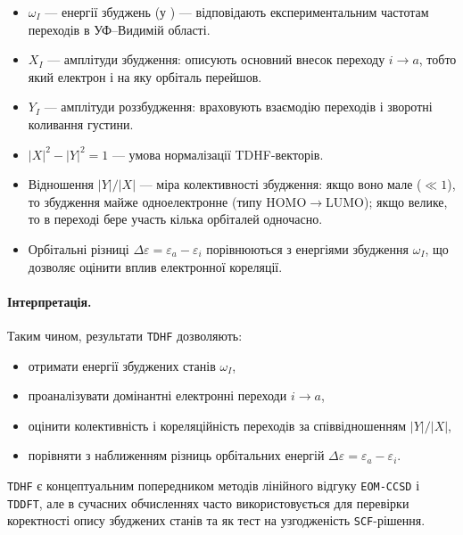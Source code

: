 \begin{itemize}
    \item \(\omega_I\) --- енергії збуджень (у ) ---
          відповідають експериментальним частотам переходів в УФ–Видимій області.
    \item \(X_I\) --- амплітуди збудження: описують основний внесок переходу \(i \to a\),
          тобто який електрон і на яку орбіталь перейшов.
    \item \(Y_I\) --- амплітуди роззбудження: враховують взаємодію переходів
          і зворотні коливання густини.
    \item \(|X|^2 - |Y|^2 = 1\) --- умова нормалізації TDHF-векторів.
    \item Відношення \(|Y|/|X|\) --- міра колективності збудження:
          якщо воно мале ($\ll 1$), то збудження майже одноелектронне (типу HOMO$\to$LUMO);
          якщо велике, то в переході бере участь кілька орбіталей одночасно.
    \item Орбітальні різниці \(\Delta\varepsilon = \varepsilon_a - \varepsilon_i\)
          порівнюються з енергіями збудження \(\omega_I\),
          що дозволяє оцінити вплив електронної кореляції.
\end{itemize}

\paragraph{Інтерпретація.}

Таким чином, результати \texttt{TDHF} дозволяють:
\begin{itemize}
    \item отримати енергії збуджених станів \(\omega_I\),
    \item проаналізувати домінантні електронні переходи \(i \to a\),
    \item оцінити колективність і кореляційність переходів за співвідношенням \(|Y|/|X|\),
    \item порівняти з наближенням різниць орбітальних енергій
          \(\Delta\varepsilon = \varepsilon_a - \varepsilon_i\).
\end{itemize}

\texttt{TDHF} є концептуальним попередником методів лінійного відгуку
\texttt{EOM-CCSD} і \texttt{TDDFT}, але в сучасних обчисленнях
часто використовується для перевірки коректності опису збуджених станів
та як тест на узгодженість \texttt{SCF}-рішення.


